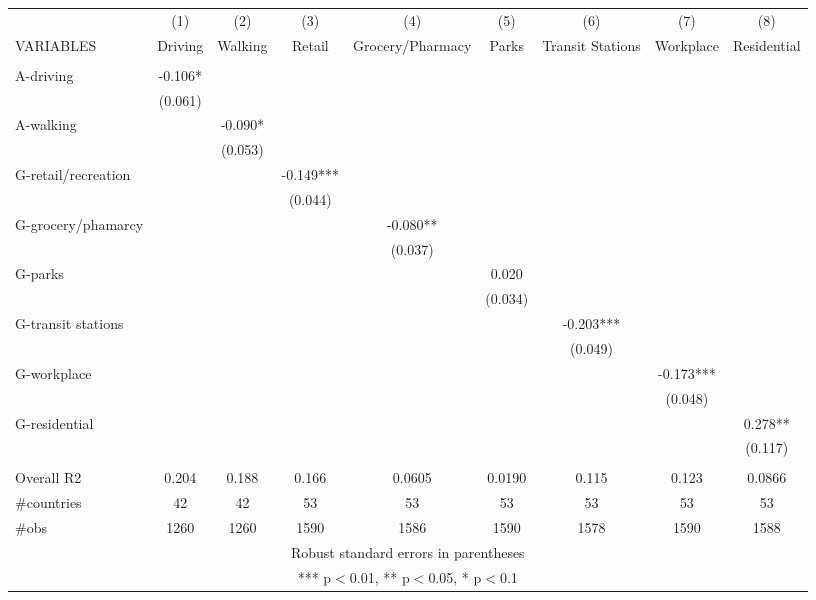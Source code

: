\documentclass[]{article}
\begin{document}
\begin{tabular}{lcccccccc} \hline
 & (1) & (2) & (3) & (4) & (5) & (6) & (7) & (8) \\
VARIABLES & Driving & Walking & Retail & Grocery/Pharmacy & Parks & Transit Stations & Workplace & Residential \\ \hline
 &  &  &  &  &  &  &  &  \\
A-driving & -0.106* &  &  &  &  &  &  &  \\
 & (0.061) &  &  &  &  &  &  &  \\
A-walking &  & -0.090* &  &  &  &  &  &  \\
 &  & (0.053) &  &  &  &  &  &  \\
G-retail/recreation &  &  & -0.149*** &  &  &  &  &  \\
 &  &  & (0.044) &  &  &  &  &  \\
G-grocery/phamarcy &  &  &  & -0.080** &  &  &  &  \\
 &  &  &  & (0.037) &  &  &  &  \\
G-parks &  &  &  &  & 0.020 &  &  &  \\
 &  &  &  &  & (0.034) &  &  &  \\
G-transit stations &  &  &  &  &  & -0.203*** &  &  \\
 &  &  &  &  &  & (0.049) &  &  \\
G-workplace &  &  &  &  &  &  & -0.173*** &  \\
 &  &  &  &  &  &  & (0.048) &  \\
G-residential &  &  &  &  &  &  &  & 0.278** \\
 &  &  &  &  &  &  &  & (0.117) \\
 &  &  &  &  &  &  &  &  \\
Overall R2 & 0.204 & 0.188 & 0.166 & 0.0605 & 0.0190 & 0.115 & 0.123 & 0.0866 \\
\#countries & 42 & 42 & 53 & 53 & 53 & 53 & 53 & 53 \\
 \#obs & 1260 & 1260 & 1590 & 1586 & 1590 & 1578 & 1590 & 1588 \\ \hline
\multicolumn{9}{c}{ Robust standard errors in parentheses} \\
\multicolumn{9}{c}{ *** p$<$0.01, ** p$<$0.05, * p$<$0.1} \\
\end{tabular}
\end{document}
